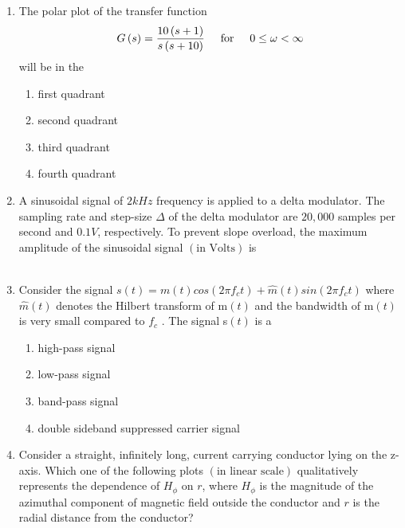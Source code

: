 \documentclass[12pt,-letter paper]{article}
\providecommand{\brak}[1]{\ensuremath{\left(#1\right)}}
\theoremstyle{remark}
\begin{document}
\begin{enumerate}
    \item The polar plot of the transfer function \[G\brak{s}=\dfrac{10\brak{s+1}}{s\brak{s+10}} \hspace{0.5cm}\text{for}\hspace{0.5cm}0\leq \omega<\infty\]
     will be in the
     \begin{enumerate}
         \item first quadrant
         \item second quadrant
         \item third quadrant
         \item fourth quadrant
     \end{enumerate}
     \item A sinusoidal signal of $2 kHz$ frequency is applied to a delta modulator. The sampling rate and step-size $\Delta$ of the delta modulator are $20,000$ samples per second and $0.1 V$, respectively. To prevent slope overload, the maximum amplitude of the sinusoidal signal \brak{\text{in Volts}} is\\
    \\ 
     \item Consider the signal $s\brak{t}=m\brak{t}cos\brak{2\pi f_ct}+\hat{m}\brak{t}sin\brak{2\pi f_ct}$ where $\hat{m}\brak{t}$ denotes the Hilbert transform of m\brak{t} and the bandwidth of m\brak{t} is very small compared to $f_c$ . The signal s\brak{t} is a
     \begin{enumerate}
         \item high-pass signal
         \item low-pass signal
         \item band-pass signal
         \item double sideband suppressed carrier signal
     \end{enumerate}
     \item Consider a straight, infinitely long, current carrying conductor lying on the z-axis. Which one of the following plots \brak{\text{in linear scale}} qualitatively represents the dependence of $H_\phi$ on $r$, where $H_\phi$ is the magnitude of the azimuthal component of magnetic field outside the conductor and $r$ is the radial distance from the conductor?\\

\end{enumerate}
\end{document}
